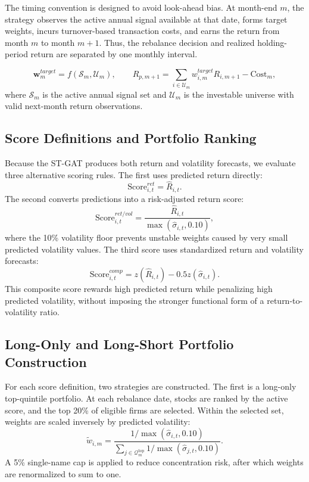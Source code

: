 \documentclass[11pt, a4paper]{article}
\begin{document}
The timing convention is designed to avoid look-ahead bias. At month-end $m$, the strategy observes the active annual signal available at that date, forms target weights, incurs turnover-based transaction costs, and earns the return from month $m$ to month $m+1$. Thus, the rebalance decision and realized holding-period return are separated by one monthly interval.

\begin{equation}
\mathbf{w}_{m}^{target}=f\left(\mathcal{S}_{m},\mathcal{U}_{m}\right), \qquad
R_{p,m+1}=\sum_{i\in\mathcal{U}_{m}}w_{i,m}^{target}R_{i,m+1}-\text{Cost}_{m},
\end{equation}
where $\mathcal{S}_{m}$ is the active annual signal set and $\mathcal{U}_{m}$ is the investable universe with valid next-month return observations.

\subsection{Score Definitions and Portfolio Ranking}
Because the ST-GAT produces both return and volatility forecasts, we evaluate three alternative scoring rules. The first uses predicted return directly:
\begin{equation}
\text{Score}^{ret}_{i,t}=\widehat{R}_{i,t}.
\end{equation}
The second converts predictions into a risk-adjusted return score:
\begin{equation}
\text{Score}^{ret/vol}_{i,t}=\frac{\widehat{R}_{i,t}}{\max(\widehat{\sigma}_{i,t},0.10)},
\end{equation}
where the 10\% volatility floor prevents unstable weights caused by very small predicted volatility values. The third score uses standardized return and volatility forecasts:
\begin{equation}
\text{Score}^{comp}_{i,t}=z(\widehat{R}_{i,t})-0.5z(\widehat{\sigma}_{i,t}).
\end{equation}
This composite score rewards high predicted return while penalizing high predicted volatility, without imposing the stronger functional form of a return-to-volatility ratio.

\subsection{Long-Only and Long-Short Portfolio Construction}
For each score definition, two strategies are constructed. The first is a long-only top-quintile portfolio. At each rebalance date, stocks are ranked by the active score, and the top 20\% of eligible firms are selected. Within the selected set, weights are scaled inversely by predicted volatility:
\begin{equation}
\tilde{w}_{i,m}=\frac{1/\max(\widehat{\sigma}_{i,t},0.10)}{\sum_{j\in\mathcal{Q}^{\text{top}}_{m}}1/\max(\widehat{\sigma}_{j,t},0.10)}.
\end{equation}
A 5\% single-name cap is applied to reduce concentration risk, after which weights are renormalized to sum to one.
\end{document}
